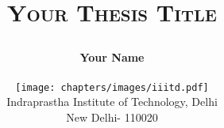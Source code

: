\documentclass[12pt,a4paper,twoside]{report}
\title{
    \vspace{-2in}
    \Huge
    \textsc{Your Thesis Title}\\
    
    \author{
        {\Huge\textbf{\color{DarkSlateGrey} Your Name}}\\
        \centerline{\texttt{[image: chapters/images/iiitd.pdf]}}
        {\normalsize Indraprastha Institute of Technology, Delhi\par 
        New Delhi- 110020
        }\\

    }
}
\date{}
\begin{document}
%  
\maketitle
\cleardoublepage

\frontmatter

\begin{spacing}{1}
\tableofcontents
\end{spacing}

\mainmatter
%
\cleardoublepage
\backmatter
 \begin{spacing}{1}
    {\tiny\printbibliography}
\end{spacing}
\end{document}
